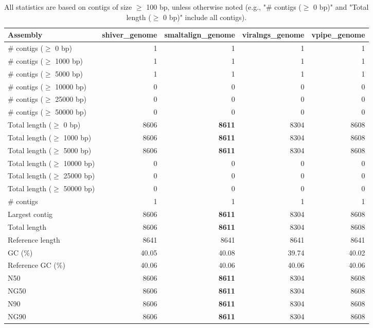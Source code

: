 \documentclass[12pt,a4paper]{article}
\begin{document}
\begin{table}[ht]
\begin{center}
\caption{All statistics are based on contigs of size $\geq$ 100 bp, unless otherwise noted (e.g., "\# contigs ($\geq$ 0 bp)" and "Total length ($\geq$ 0 bp)" include all contigs).}
\begin{tabular}{|l*{4}{|r}|}
\hline
Assembly & shiver\_genome & smaltalign\_genome & viralngs\_genome & vpipe\_genome \\ \hline
\# contigs ($\geq$ 0 bp) & 1 & 1 & 1 & 1 \\ \hline
\# contigs ($\geq$ 1000 bp) & 1 & 1 & 1 & 1 \\ \hline
\# contigs ($\geq$ 5000 bp) & 1 & 1 & 1 & 1 \\ \hline
\# contigs ($\geq$ 10000 bp) & 0 & 0 & 0 & 0 \\ \hline
\# contigs ($\geq$ 25000 bp) & 0 & 0 & 0 & 0 \\ \hline
\# contigs ($\geq$ 50000 bp) & 0 & 0 & 0 & 0 \\ \hline
Total length ($\geq$ 0 bp) & 8606 & {\bf 8611} & 8304 & 8608 \\ \hline
Total length ($\geq$ 1000 bp) & 8606 & {\bf 8611} & 8304 & 8608 \\ \hline
Total length ($\geq$ 5000 bp) & 8606 & {\bf 8611} & 8304 & 8608 \\ \hline
Total length ($\geq$ 10000 bp) & 0 & 0 & 0 & 0 \\ \hline
Total length ($\geq$ 25000 bp) & 0 & 0 & 0 & 0 \\ \hline
Total length ($\geq$ 50000 bp) & 0 & 0 & 0 & 0 \\ \hline
\# contigs & 1 & 1 & 1 & 1 \\ \hline
Largest contig & 8606 & {\bf 8611} & 8304 & 8608 \\ \hline
Total length & 8606 & {\bf 8611} & 8304 & 8608 \\ \hline
Reference length & 8641 & 8641 & 8641 & 8641 \\ \hline
GC (\%) & 40.05 & 40.08 & 39.74 & 40.02 \\ \hline
Reference GC (\%) & 40.06 & 40.06 & 40.06 & 40.06 \\ \hline
N50 & 8606 & {\bf 8611} & 8304 & 8608 \\ \hline
NG50 & 8606 & {\bf 8611} & 8304 & 8608 \\ \hline
N90 & 8606 & {\bf 8611} & 8304 & 8608 \\ \hline
NG90 & 8606 & {\bf 8611} & 8304 & 8608 \\ \hline

\end{tabular}
\end{center}
\end{table}
\end{document}
